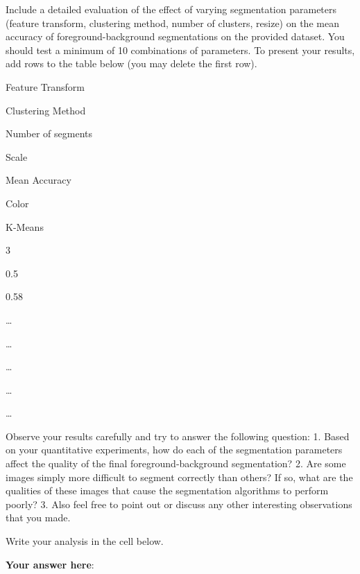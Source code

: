 \documentclass[11pt]{article}
\begin{document}
    Include a detailed evaluation of the effect of varying segmentation
parameters (feature transform, clustering method, number of clusters,
resize) on the mean accuracy of foreground-background segmentations on
the provided dataset. You should test a minimum of 10 combinations of
parameters. To present your results, add rows to the table below (you
may delete the first row).

    Feature Transform

Clustering Method

Number of segments

Scale

Mean Accuracy

Color

K-Means

3

0.5

0.58

\ldots{}

\ldots{}

\ldots{}

\ldots{}

\ldots{}

    Observe your results carefully and try to answer the following question:
1. Based on your quantitative experiments, how do each of the
segmentation parameters affect the quality of the final
foreground-background segmentation? 2. Are some images simply more
difficult to segment correctly than others? If so, what are the
qualities of these images that cause the segmentation algorithms to
perform poorly? 3. Also feel free to point out or discuss any other
interesting observations that you made.

Write your analysis in the cell below.

    \textbf{Your answer here}:


    
    
    
    
\end{document}
